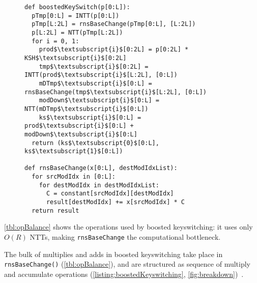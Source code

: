 
    \begin{figure}\label{lst:boostedKeyswitching}
      \begin{center}
          \begin{lstlisting}[caption={Boosted keyswitching implementation (1-digit).}, mathescape=true, label=listing:boostedKeyswitching]
def boostedKeySwitch(p[0:L]):
  pTmp[0:L] = INTT(p[0:L])
  pTmp[L:2L] = rnsBaseChange(pTmp[0:L], [L:2L])
  p[L:2L] = NTT(pTmp[L:2L])
  for i = 0, 1:
    prod$\textsubscript{i}$[0:2L] = p[0:2L] * KSH$\textsubscript{i}$[0:2L]
    tmp$\textsubscript{i}$[0:2L] = INTT(prod$\textsubscript{i}$[L:2L], [0:L])
    mDTmp$\textsubscript{i}$[0:L] = rnsBaseChange(tmp$\textsubscript{i}$[L:2L], [0:L])
    modDown$\textsubscript{i}$[0:L] = NTT(mDTmp$\textsubscript{i}$[0:L])
    ks$\textsubscript{i}$[0:L] = prod$\textsubscript{i}$[0:L] + modDown$\textsubscript{i}$[0:L]
  return (ks$\textsubscript{0}$[0:L], ks$\textsubscript{1}$[0:L])

def rnsBaseChange(x[0:L], destModIdxList):
  for srcModIdx in [0:L]:
    for destModIdx in destModIdxList:
      C = constant[srcModIdx][destModIdx]
      result[destModIdx] += x[srcModIdx] * C
  return result
          \end{lstlisting}
        \end{center}
	\vspace{6pt}
      \end{figure}

\tblOpBalance

\autoref{tbl:opBalance} shows the operations used by boosted keyswitching: it
uses only $O(R)$ NTTs, making \verb!rnsBaseChange! the computational
bottleneck.

The bulk of multiplies and adds in boosted keyswitching take place in \verb!rnsBaseChange()!
(\autoref{tbl:opBalance}), and are structured as sequence of multiply and accumulate
operations (\autoref{listing:boostedKeyswitching}, \autoref{fig:breakdown})~\cite{bajard2017full}.

